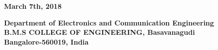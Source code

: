 \begin{center}
\vspace*{3mm}

{\fontsize{14pt}{16.8pt}\selectfont\textbf{March 7th, 2018}} \\

\vspace*{5mm}

\fontsize{14pt}{16.8pt}\selectfont\textbf{Department of Electronics and Communication Engineering \\
\vspace*{4mm}
\vspace*{2mm} B.M.S COLLEGE OF ENGINEERING, Basavanagudi} \\
\vspace*{2mm}
\fontsize{14pt}{16.8pt}\selectfont\textbf{Bangalore-560019, India} 
\vspace*{10mm}\\

\end{center}
